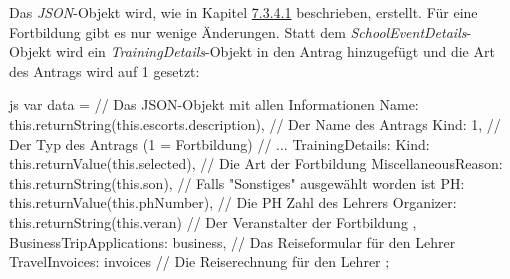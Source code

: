 Das \textit{JSON}-Objekt wird, wie in Kapitel \hyperref[code_submit_data]{7.3.4.1} beschrieben, erstellt. Für eine Fortbildung gibt es nur wenige Änderungen.
Statt dem \textit{SchoolEventDetails}-Objekt wird ein \textit{TrainingDetails}-Objekt in den Antrag hinzugefügt und die Art des Antrags wird auf 1 gesetzt:
\begin{code}{js}
var data = {		// Das JSON-Objekt mit allen Informationen
	Name: this.returnString(this.escorts.description),	// Der Name des Antrags
	Kind: 1,	// Der Typ des Antrags (1 = Fortbildung)
	// ...
	TrainingDetails: {
		Kind: this.returnValue(this.selected),	// Die Art der Fortbildung
		MiscellaneousReason: this.returnString(this.son),	// Falls "Sonstiges" ausgewählt worden ist
		PH: this.returnValue(this.phNumber),	// Die PH Zahl des Lehrers
		Organizer: this.returnString(this.veran)	// Der Veranstalter der Fortbildung
	},
	BusinessTripApplications: business,	// Das Reiseformular für den Lehrer
	TravelInvoices: invoices	// Die Reiserechnung für den Lehrer
};
\end{code}
~\\
\newpage
